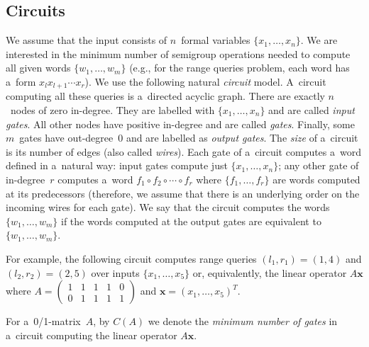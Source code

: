 \documentclass[11pt,letterpaper]{article}
\begin{document}
\subsection{Circuits}
We assume that the input consists of $n$~formal variables
$\{x_1, \dotsc, x_n\}$. We are interested in the minimum number of semigroup
operations needed to compute all given words $\{w_1, \dotsc, w_m\}$ (e.g., for
the range queries problem, each word has a~form $x_lx_{l+1}\dotsb x_r$). We use
the following natural {\em circuit} model. A~circuit computing all these queries
is a~directed acyclic graph. There are exactly $n$~nodes of zero in-degree. They
are labelled with $\{x_1, \dotsc, x_n\}$ and are called {\em input gates}. All
other nodes have positive in-degree and are called {\em gates}. Finally, some
$m$~gates have out-degree~0 and are labelled as {\em output gates}. The
{\em size} of a~circuit is its number of edges (also called {\em wires}). Each
gate of a~circuit computes a~word defined in a~natural way: input gates compute
just $\{x_1, \dotsc, x_n\}$; any other gate of in-degree~$r$ computes a~word
$f_1 \circ f_2 \circ \dotsb \circ f_r$ where $\{f_1, \dotsc, f_r\}$ are words
computed at its predecessors (therefore, we assume that there is an underlying
order on the incoming wires for each gate). We say that the circuit computes the
words $\{w_1, \dotsc, w_m\}$ if the words computed at the output gates are
equivalent to $\{w_1, \dotsc, w_m\}$.

For example, the following circuit computes range queries $(l_1,r_1)=(1,4)$ and
$(l_2,r_2)=(2,5)$ over inputs $\{x_1, \dotsc, x_5\}$ or, equivalently, the
linear operator $A\mathbf{x}$ where
$A=\begin{pmatrix}1&1&1&1&0\\0&1&1&1&1\end{pmatrix}$ and
$\mathbf{x}=(x_1, \dotsc, x_5)^T$.

\begin{center}
\end{center}

For a~0/1-matrix~$A$, by $C(A)$ we denote the \emph{minimum number of gates} in
a~circuit computing the linear operator $A\mathbf{x}$.
\end{document}
